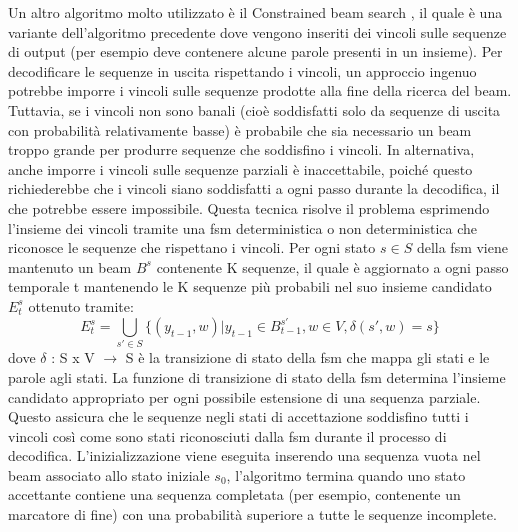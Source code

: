 Un altro algoritmo molto utilizzato è il Constrained beam search \cite{anderson2016guided}, il quale è una variante dell'algoritmo precedente dove vengono inseriti dei vincoli sulle sequenze di output (per esempio deve contenere alcune parole presenti in un insieme). Per decodificare le sequenze in uscita rispettando i vincoli, un approccio ingenuo potrebbe imporre i vincoli sulle sequenze prodotte alla fine della ricerca del beam. Tuttavia, se i vincoli non sono banali (cioè soddisfatti solo da sequenze di uscita con probabilità relativamente basse) è probabile che sia necessario un beam troppo grande per produrre sequenze che soddisfino i vincoli. In alternativa, anche imporre i vincoli sulle sequenze parziali è inaccettabile, poiché questo richiederebbe che i vincoli siano soddisfatti a ogni passo durante la decodifica, il che potrebbe essere impossibile.
Questa tecnica risolve il problema esprimendo l'insieme dei vincoli tramite una \acrfull{fsm} deterministica o non deterministica che riconosce le sequenze che rispettano i vincoli. Per ogni stato $s \in S$ della \acrshort{fsm} viene mantenuto un beam $B^s$ contenente K sequenze, il quale è aggiornato a ogni passo temporale t mantenendo le K sequenze più probabili nel suo insieme candidato $E_{t}^s$ ottenuto tramite: 
\begin{equation*}
E_{t}^s = \bigcup_{s' \in S}\{(y_{t-1},w)  |  y_{t-1} \in B_{t-1}^{s'}, w \in V, \delta (s', w) = s\}
\end{equation*}
dove $\delta$ : S x V $\rightarrow$ S è la transizione di stato della \acrshort{fsm} che mappa gli stati e le parole agli stati.
La funzione di transizione di stato della \acrshort{fsm} determina l'insieme candidato appropriato per ogni possibile estensione di una sequenza parziale. Questo assicura che le sequenze negli stati di accettazione soddisfino tutti i vincoli così come sono stati riconosciuti dalla \acrshort{fsm} durante il processo di decodifica. L'inizializzazione viene eseguita inserendo una sequenza vuota nel beam associato allo stato iniziale $s_0$, l'algoritmo termina quando uno stato accettante contiene una sequenza completata (per esempio, contenente un marcatore di fine) con una probabilità superiore a tutte le sequenze incomplete.
\newpage
